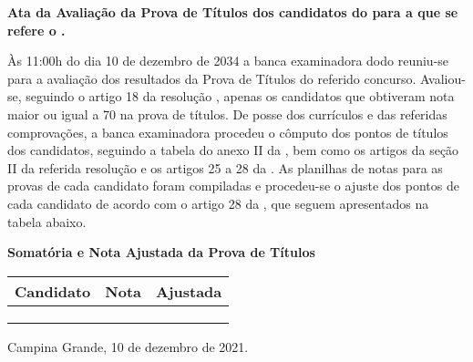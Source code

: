 \documentclass[12pt]{uaefata}
\begin{document}
\begin{letter}{
		\textbf{Ata da Avaliação da Prova de Títulos dos candidatos do \concurso para \cargo  a que se refere o \edital.}
	}
 
\opening{}

Às 11:00h do dia 10 de dezembro de 2034 a banca examinadora do\concurso do \edital reuniu-se para a avaliação dos resultados da Prova de Títulos do referido concurso. Avaliou-se, seguindo o artigo 18 da resolução \resconc, apenas os candidatos que obtiveram nota maior ou igual a 70 na prova de títulos. De posse dos currículos e das referidas comprovações, a banca examinadora procedeu o cômputo dos pontos de títulos dos candidatos, seguindo a tabela do anexo II da \resconc, bem como os artigos da seção II da referida resolução e os artigos 25 a 28 da \resconc. As planilhas de notas para as provas de cada candidato foram compiladas e procedeu-se o ajuste dos pontos de cada candidato de acordo com o artigo 28 da \resconc, que seguem apresentados na tabela abaixo.


\newpage


\centering

\textbf{Somatória e Nota Ajustada da Prova de Títulos}

\begin{tabular}{|l|r|r|}
	\hline
	\textbf{Candidato}	&	\textbf{Nota}	&	\textbf{Ajustada}	\\
	\hline
	\cdta	&	\cdtanto	&	\cdtant	\\
	\cdtb	&	\cdtbnto	&	\cdtbnt	\\
	\cdtc	&	\cdtbnto	&	\cdtcnt	\\
	\hline
\end{tabular}




\closing{Campina Grande, 10 de dezembro de 2021.}




\end{letter}
\end{document}
